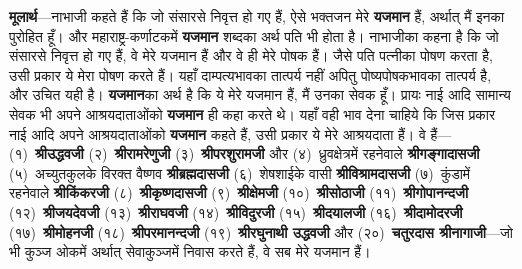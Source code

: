 \begin{sloppypar}\justifying{}
\textbf{मूलार्थ}—नाभाजी कहते हैं कि जो संसारसे निवृत्त हो गए हैं, ऐसे भक्तजन मेरे \textbf{यजमान} हैं, अर्थात् मैं इनका पुरोहित हूँ। और महाराष्ट्र-कर्णाटकमें \textbf{यजमान} शब्दका अर्थ पति भी होता है। नाभाजीका कहना है कि जो संसारसे निवृत्त हो गए हैं, वे मेरे यजमान हैं और वे ही मेरे पोषक हैं। जैसे पति पत्नीका पोषण करता है, उसी प्रकार ये मेरा पोषण करते हैं। यहाँ दाम्पत्य\-भावका तात्पर्य नहीं अपितु पोष्य\-पोषक\-भावका तात्पर्य है, और उचित यही है। \textbf{यजमान}का अर्थ है कि ये मेरे यजमान हैं, मैं उनका सेवक हूँ। प्रायः नाई आदि सामान्य सेवक भी अपने आश्रयदाताओंको \textbf{यजमान} ही कहा करते थे। यहाँ वही भाव देना चाहिये कि जिस प्रकार नाई आदि अपने आश्रयदाताओंको \textbf{यजमान} कहते हैं, उसी प्रकार ये मेरे आश्रयदाता हैं। वे हैं—(१)~\textbf{श्रीउद्धवजी} (२)~\textbf{श्रीरामरेणुजी} (३)~\textbf{श्रीपरशुरामजी} और (४)~ध्रुवक्षेत्रमें रहनेवाले \textbf{श्रीगङ्गादासजी} (५)~अच्युतकुलके विरक्त वैष्णव \textbf{श्रीब्रह्मदासजी} (६)~शेषशाईके वासी \textbf{श्रीविश्रामदासजी} (७)~कुंडामें रहनेवाले \textbf{श्रीकिंकरजी} (८)~\textbf{श्रीकृष्णदासजी} (९)~\textbf{श्रीक्षेमजी} (१०)~\textbf{श्रीसोठाजी} (११)~\textbf{श्रीगोपानन्दजी} (१२)~\textbf{श्रीजयदेवजी} (१३)~\textbf{श्रीराघवजी} (१४)~\textbf{श्रीविदुरजी} (१५)~\textbf{श्रीदयालजी} (१६)~\textbf{श्रीदामोदरजी} (१७)~\textbf{श्रीमोहनजी} (१८)~\textbf{श्रीपरमानन्दजी} (१९)~\textbf{श्रीरघुनाथी उद्धवजी} और (२०)~\textbf{चतुरदास श्रीनागाजी}—जो भी कुञ्ज ओकमें अर्थात् सेवाकुञ्जमें निवास करते हैं, वे सब मेरे यजमान हैं।
\end{sloppypar}


